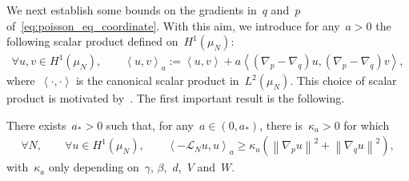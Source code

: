\documentclass[onefignum,onetabnum]{siamart251216} %
\newcommand{\norm}[1]{\left\lVert#1\right\rVert}
\newcommand{\mc}[1]{\mathcal{#1}}
\renewcommand{\geq}{\geqslant}
\newcommand{\mescin}{\mu}
\newcommand{\slangle}[1]{\left\langle #1 \right\rangle}
\theoremstyle{plain}
\numberwithin{equation}{section}
\numberwithin{theorem}{section}
\begin{document}
We next establish some bounds on the gradients in~$q$ and~$p$ of~\eqref{eq:poisson_eq_coordinate}.
With this aim, we introduce for any~$a>0$ the following scalar product defined on~$H^1(\mescin_N)$:
\begin{align}
    \label{eq:prod_scal_H1_bis}
\forall u,v\in H^1(\mescin_N),\qquad
\slangle{u,v}_a := \slangle{u,v} + a \slangle{(\nabla_p-\nabla_q)u,(\nabla_p-\nabla_q)v},
\end{align}
where~$\slangle{\cdot,\cdot}$ is the canonical scalar product in~$L^2(\mescin_N)$. This choice of scalar product is motivated by~\cite{LetiziaOlla2017}. The first important result is the following.
\begin{lemma}
    \label{lem:born_inf_norm_H1}
    There exists~$a_*>0$ such that, for any~$a \in (0,a_*)$, there is~$\kappa_a >0$ for which
    \begin{align*}
        \forall N,\qquad \forall u\in H^1(\mescin_N),\qquad\slangle{-\mc{L}_N u ,u}_a \geq \kappa_a \left(\norm{\nabla_p u}^2+\norm{\nabla_q u}^2\right),
    \end{align*}
    with~$\kappa_a$ only depending on~$\gamma$, $\beta$,~$d$,~$V$ and~$W$.
\end{lemma}
\end{document}
